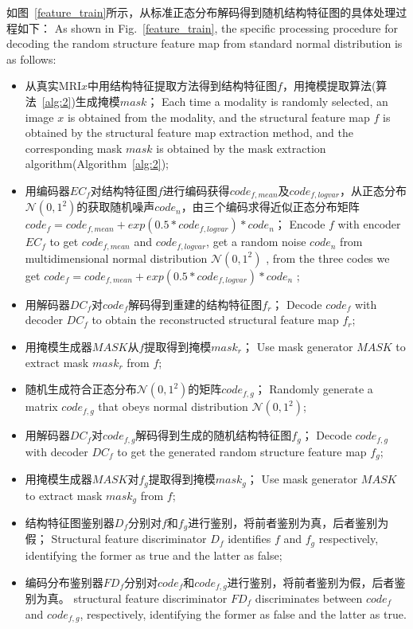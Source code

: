 \documentclass[letterpaper]{article} %
\begin{document}
如图~\ref{feature_train}所示，从标准正态分布解码得到随机结构特征图的具体处理过程如下：
As shown in Fig.~\ref{feature_train}, the specific processing procedure for decoding the random structure feature map from standard normal distribution is as follows:
\begin{itemize}
	\item 从真实MRI$x$中用结构特征提取方法得到结构特征图$f$，用掩模提取算法(算法~\ref{alg:2})生成掩模$mask$；
	Each time a modality is randomly selected, an image $x$ is obtained from the modality, and the structural feature map $f$ is obtained by the structural feature map extraction method, and the corresponding mask $mask$ is obtained by the mask extraction algorithm(Algorithm~\ref{alg:2});
	\item 用编码器$EC_f$对结构特征图$f$进行编码获得$code_{f,mean}$及$code_{f,logvar}$，从正态分布$\mathcal{N}(0,1^2)$的获取随机噪声$code_n$，由三个编码求得近似正态分布矩阵$code_f=code_{f,mean}+exp(0.5*code_{f,logvar})*code_n$；
	Encode $f$ with encoder $EC_f$ to get $code_{f,mean}$ and $code_{f,logvar}$, get a random noise $code_n$ from multidimensional normal distribution $\mathcal{N}(0,1^2)$ , from the three codes we get $code_f=code_{f,mean}+exp(0.5*code_{f,logvar})*code_n$ ;
	\item 用解码器$DC_f$对$code_f$解码得到重建的结构特征图$f_r$；
	Decode $code_f$ with decoder $DC_f$ to obtain the reconstructed structural feature map $f_r$;
	\item 用掩模生成器$MASK$从$f$提取得到掩模$mask_r$；
	Use mask generator $MASK$ to extract mask $mask_r$ from $f$;
	\item 随机生成符合正态分布$\mathcal{N}(0,1^2)$的矩阵$code_{f,g}$；
	Randomly generate a matrix $code_{f,g}$ that obeys normal distribution $\mathcal{N}(0,1^2)$;
	\item 用解码器$DC_f$对$code_{f,g}$解码得到生成的随机结构特征图$f_g$；
	Decode $code_{f,g}$ with decoder $DC_f$ to get the generated random structure feature map $f_g$;
	\item 用掩模生成器$MASK$对$f_g$提取得到掩模$mask_g$；
	Use mask generator $MASK$ to extract mask $mask_g$ from $f$;
	\item 结构特征图鉴别器$D_f$分别对$f$和$f_g$进行鉴别，将前者鉴别为真，后者鉴别为假；
	Structural feature discriminator $D_f$ identifies $f$ and $f_g$ respectively, identifying the former as true and the latter as false;
	\item 编码分布鉴别器$FD_f$分别对$code_f$和$code_{f,g}$进行鉴别，将前者鉴别为假，后者鉴别为真。
	structural feature discriminator $FD_f$ discriminates between $code_f$ and $code_{f,g}$, respectively, identifying the former as false and the latter as true.
\end{itemize}
\end{document}
